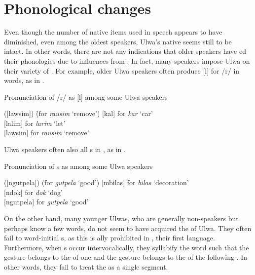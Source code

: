 
\section{Phonological changes}\label{sec:15.2}


Even though the number of native  items used in speech appears to have diminished, even among the oldest speakers, Ulwa’s native  seems still to be intact. In other words, there are not any indications that older speakers have ed their  phonologies due to influences from . In fact, many speakers impose Ulwa  on their variety of . For example, older Ulwa speakers often produce [l] for /r/ in  words, as in .

\ea%
    \label{ex:loss:1a}
     Pronunciation of  /r/ as [l] among some Ulwa speakers
\begin{tabbing}
{([lawsim])} \= {(for  \textit{rausim} ‘remove’)}\kill
{[kal]} \> for  \textit{kar} ‘car’\\
{[lalim]} \> for  \textit{larim} ‘let’\\
{[lawsim]}  \>  for  \textit{rausim} ‘remove’
  \end{tabbing}
\z

Ulwa speakers often also  all  s in , as in .

\ea%
    \label{ex:loss:1b}
     Pronunciation of   s as  among some Ulwa speakers
\begin{tabbing}
    {([ngutpela])} \= {(for  \textit{gutpela} ‘good’)}\kill
    {[mbilas]} \> for  \textit{bilas} ‘decoration’\\
   {[ndok]} \> for  \textit{dok} ‘dog’\\
    {[ngutpela]}  \>  for  \textit{gutpela} ‘good’
  \end{tabbing}
\z

On the other hand, many younger Ulwas, who are generally non-speakers but perhaps know a few words, do not seem to have acquired the  of Ulwa. They often fail to  word-initial  s, as this is ally prohibited in , their first language. Furthermore, when   s occur intervocalically, they syllabify the word such that the  gesture belongs to the  of one  and the  gesture belongs to the  of the following . In other words, they fail to treat the    as a single segment.


